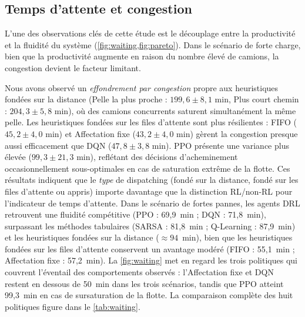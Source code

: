 \documentclass[11pt,a4paper]{article}
\begin{document}
\subsection{Temps d'attente et congestion}
\label{sec:waiting}

L'une des observations clés de cette étude est le découplage entre la productivité et la fluidité du système (\cref{fig:waiting,fig:pareto}). Dans le scénario de forte charge, bien que la productivité augmente en raison du nombre élevé de camions, la congestion devient le facteur limitant.

Nous avons observé un \textit{effondrement par congestion} propre aux heuristiques fondées sur la distance (Pelle la plus proche : $199{,}6 \pm 8{,}1$ min, Plus court chemin : $204{,}3 \pm 5{,}8$ min), où des camions concurrents saturent simultanément la même pelle. Les heuristiques fondées sur les files d'attente sont plus résilientes : FIFO ($45{,}2 \pm 4{,}0$ min) et Affectation fixe ($43{,}2 \pm 4{,}0$ min) gèrent la congestion presque aussi efficacement que DQN ($47{,}8 \pm 3{,}8$ min). PPO présente une variance plus élevée ($99{,}3 \pm 21{,}3$ min), reflétant des décisions d'acheminement occasionnellement sous-optimales en cas de saturation extrême de la flotte. Ces résultats indiquent que le \emph{type} de dispatching (fondé sur la distance, fondé sur les files d'attente ou appris) importe davantage que la distinction RL/non-RL pour l'indicateur de temps d'attente. Dans le scénario de fortes pannes, les agents DRL retrouvent une fluidité compétitive (PPO : 69,9~min ; DQN : 71,8~min), surpassant les méthodes tabulaires (SARSA : 81,8~min ; Q-Learning : 87,9~min) et les heuristiques fondées sur la distance ($\approx\!94$~min), bien que les heuristiques fondées sur les files d'attente conservent un avantage modéré (FIFO : 55,1~min ; Affectation fixe : 57,2~min). La \cref{fig:waiting} met en regard les trois politiques qui couvrent l'éventail des comportements observés : l'Affectation fixe et DQN restent en dessous de 50~min dans les trois scénarios, tandis que PPO atteint 99,3~min en cas de sursaturation de la flotte. La comparaison complète des huit politiques figure dans le \cref{tab:waiting}.
\end{document}
